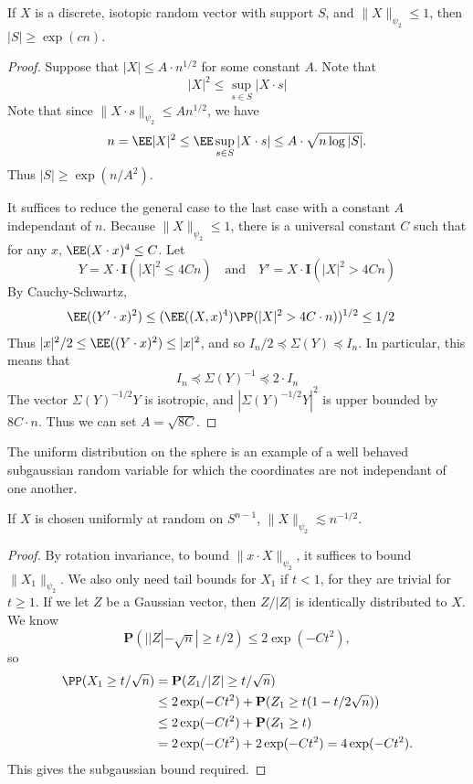 \begin{theorem}
	If $X$ is a discrete, isotopic random vector with support $S$, and $\| X \|_{\psi_2} \leq 1$, then $|S| \geq \exp(cn)$.
\end{theorem}
\begin{proof}
	Suppose that $|X| \leq A \cdot n^{1/2}$ for some constant $A$. Note that
	\[ |X|^2 \leq \sup_{s \in S} |X \cdot s| \]
	Note that since $\| X \cdot s \|_{\psi_2} \leq A n^{1/2}$, we have
	\[ n = \EE |X|^2 \leq \EE \sup_{s \in S} |X \cdot s| \leq A \cdot \sqrt{n \log |S|}. \]
	Thus $|S| \geq \exp(n/A^2)$.

	It suffices to reduce the general case to the last case with a constant $A$ independant of $n$. Because $\| X \|_{\psi_2} \leq 1$, there is a universal constant $C$ such that for any $x$, $\EE (X \cdot x)^4 \leq C$. Let
	\[ Y = X \cdot \mathbf{I}(|X|^2 \leq 4C n)\quad\text{and}\quad Y' = X \cdot \mathbf{I}(|X|^2 > 4 C n) \]
	By Cauchy-Schwartz,
	\begin{align*}
		\EE((Y' \cdot x)^2) &\leq (\EE((X,x)^4) \PP(|X|^2 > 4 C\cdot n) )^{1/2} \leq 1/2
	\end{align*}
	Thus $|x|^2/2 \leq \EE((Y \cdot x)^2) \leq |x|^2$, and so $I_n / 2 \preceq \Sigma(Y) \preceq I_n$. In particular, this means that
	\[ I_n \preceq \Sigma(Y)^{-1} \preceq 2 \cdot I_n \]
	The vector $\Sigma(Y)^{-1/2} Y$ is isotropic, and $|\Sigma(Y)^{-1/2} Y|^2$ is upper bounded by $8 C \cdot n$. Thus we can set $A = \sqrt{8C}$.
\end{proof}

The uniform distribution on the sphere is an example of a well behaved subgaussian random variable for which the coordinates are not independant of one another.

\begin{theorem}
    If $X$ is chosen uniformly at random on $S^{n-1}$, $\| X \|_{\psi_2} \lesssim n^{-1/2}$.
\end{theorem}
\begin{proof}
    By rotation invariance, to bound $\| x \cdot X \|_{\psi_2}$, it suffices to bound $\| X_1 \|_{\psi_2}$. We also only need tail bounds for $X_1$ if $t < 1$, for they are trivial for $t \geq 1$. If we let $Z$ be a Gaussian vector, then $Z/|Z|$ is identically distributed to $X$. We know
    \[ \mathbf{P}(||Z| - \sqrt{n}| \geq t/2) \leq 2\exp(-Ct^2), \]
    so
    \begin{align*}
        \PP(X_1 \geq t/\sqrt{n}) &= \mathbf{P}(Z_1/|Z| \geq t/\sqrt{n})\\
        &\leq 2\exp(-Ct^2) + \mathbf{P}(Z_1 \geq t(1 - t/2 \sqrt{n}))\\
        &\leq 2 \exp(-Ct^2) + \mathbf{P}(Z_1 \geq t)\\
        &= 2 \exp(-Ct^2) + 2 \exp(-Ct^2) = 4\exp(-Ct^2).
    \end{align*}
    This gives the subgaussian bound required.
\end{proof}

